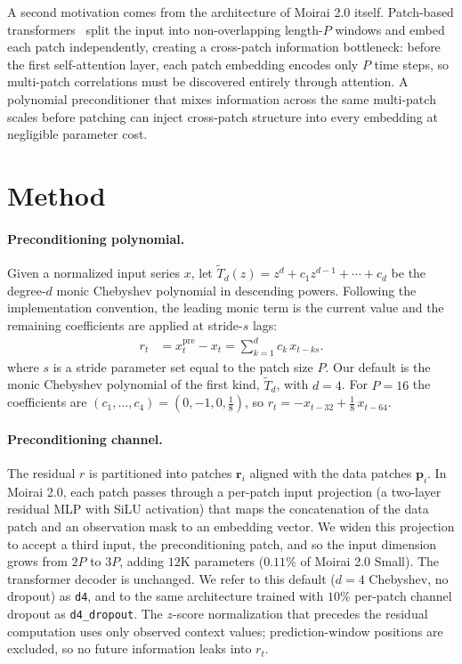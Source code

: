 \documentclass{article}
\begin{document}
A second motivation comes from the architecture of Moirai 2.0 itself. Patch-based transformers~\citep{nie2023patchtst,dosovitskiy2021image} split the input into non-overlapping length-$P$ windows and embed each patch independently, creating a cross-patch information bottleneck: before the first self-attention layer, each patch embedding encodes only $P$ time steps, so multi-patch correlations must be discovered entirely through attention. A polynomial preconditioner that mixes information across the same multi-patch scales before patching can inject cross-patch structure into every embedding at negligible parameter cost.

\section{Method}
\paragraph{Preconditioning polynomial.} Given a normalized input series $x$, let $\tilde T_d(z)=z^d+c_1 z^{d-1}+\cdots+c_d$ be the degree-$d$ monic Chebyshev polynomial in descending powers. Following the implementation convention, the leading monic term is the current value and the remaining coefficients are applied at stride-$s$ lags:
\begin{equation}
\begin{aligned}
r_t &= x_t^{\mathrm{pre}} - x_t
     = \sum_{k=1}^{d} c_k\,x_{t-ks}.
\end{aligned}
\label{eq:precond}
\end{equation}
where $s$ is a stride parameter set equal to the patch size $P$. Our default is the monic Chebyshev polynomial of the first kind, $\tilde T_d$, with $d=4$. For $P=16$ the coefficients are $(c_1,\dots,c_4) = (0,-1,0,\tfrac{1}{8})$, so $r_t = -x_{t-32} + \tfrac{1}{8}\, x_{t-64}$.

\paragraph{Preconditioning channel.} The residual $r$ is partitioned into patches $\mathbf{r}_i$ aligned with the data patches $\mathbf{p}_i$. In Moirai 2.0, each patch passes through a per-patch input projection (a two-layer residual MLP with SiLU activation) that maps the concatenation of the data patch and an observation mask to an embedding vector. We widen this projection to accept a third input, the preconditioning patch, and so the input dimension grows from $2P$ to $3P$, adding $12$K parameters ($0.11\%$ of Moirai 2.0 Small). The transformer decoder is unchanged. We refer to this default ($d=4$ Chebyshev, no dropout) as \texttt{d4}, and to the same architecture trained with $10\%$ per-patch channel dropout as \texttt{d4\_dropout}. The $z$-score normalization that precedes the residual computation uses only observed context values; prediction-window positions are excluded, so no future information leaks into $r_t$.
\end{document}
